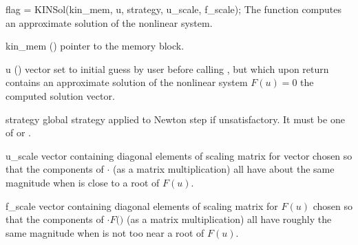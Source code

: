 {
  flag = KINSol(kin\_mem, u, strategy, u\_scale, f\_scale);
}
{
  The function  computes an approximate solution of the nonlinear
  system.
}
{
  \begin{args}[strategy]
  \item[kin\_mem] ()
    pointer to the {\kinsol} memory block.
  \item[u] ()
    vector set to initial guess by user before calling ,
    but which upon return contains an approximate solution of
    the nonlinear system $F(u) = 0$ the computed solution vector.
  \item[strategy]
    global strategy applied to Newton step if unsatisfactory.
    It must be one of  or .
  \item[u\_scale]
    vector containing diagonal elements of scaling matrix for vector 
    chosen so that the components of $\cdot$
    (as a matrix multiplication) all have about the same magnitude when 
     is close to a root of $F(u)$.
  \item[f\_scale]
    vector containing diagonal elements of scaling matrix for $F(u)$ chosen 
    so that the components of $\cdot F($$)$ 
    (as a matrix multiplication) all have roughly the same magnitude when 
     is not too near a root of $F(u)$.
  \end{args}
}
